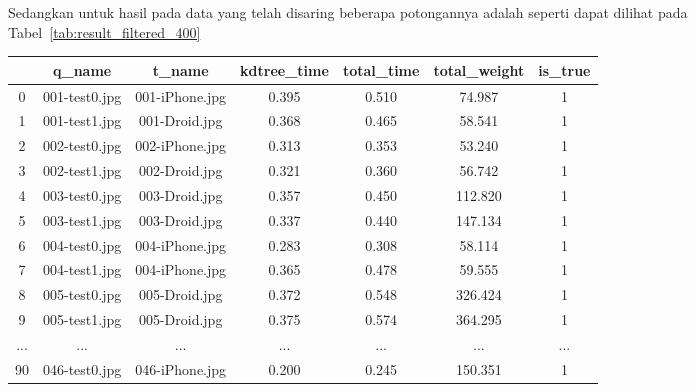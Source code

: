 Sedangkan untuk hasil pada data yang telah disaring beberapa potongannya adalah seperti dapat dilihat pada Tabel~\ref{tab:result_filtered_400}
\begin{table}[H]
	\centering
	\begin{tabular}{|c|c|c|c|c|c|c|} 
		\hline
		& \textbf{q\_name} & \textbf{t\_name} & \textbf{kdtree\_time} & \textbf{total\_time} & \textbf{total\_weight} & \textbf{is\_true}  \\ 
		\hline
		0   & 001-test0.jpg    & 001-iPhone.jpg   & 0.395                 & 0.510                & 74.987                 & 1                  \\ 
		\hline
		1   & 001-test1.jpg    & 001-Droid.jpg    & 0.368                 & 0.465                & 58.541                 & 1                  \\ 
		\hline
		2   & 002-test0.jpg    & 002-iPhone.jpg   & 0.313                 & 0.353                & 53.240                 & 1                  \\ 
		\hline
		3   & 002-test1.jpg    & 002-Droid.jpg    & 0.321                 & 0.360                & 56.742                 & 1                  \\ 
		\hline
		4   & 003-test0.jpg    & 003-Droid.jpg    & 0.357                 & 0.450                & 112.820                & 1                  \\ 
		\hline
		5   & 003-test1.jpg    & 003-Droid.jpg    & 0.337                 & 0.440                & 147.134                & 1                  \\ 
		\hline
		6   & 004-test0.jpg    & 004-iPhone.jpg   & 0.283                 & 0.308                & 58.114                 & 1                  \\ 
		\hline
		7   & 004-test1.jpg    & 004-iPhone.jpg   & 0.365                 & 0.478                & 59.555                 & 1                  \\ 
		\hline
		8   & 005-test0.jpg    & 005-Droid.jpg    & 0.372                 & 0.548                & 326.424                & 1                  \\ 
		\hline
		9   & 005-test1.jpg    & 005-Droid.jpg    & 0.375                 & 0.574                & 364.295                & 1                  \\ 
		\hline
		... & ...              & ...              & ...                   & ...                  & ...                    & ...                \\ 
		\hline
		90  & 046-test0.jpg    & 046-iPhone.jpg   & 0.200                 & 0.245                & 150.351                & 1                  \\ 

\end{tabular}
\end{table}
